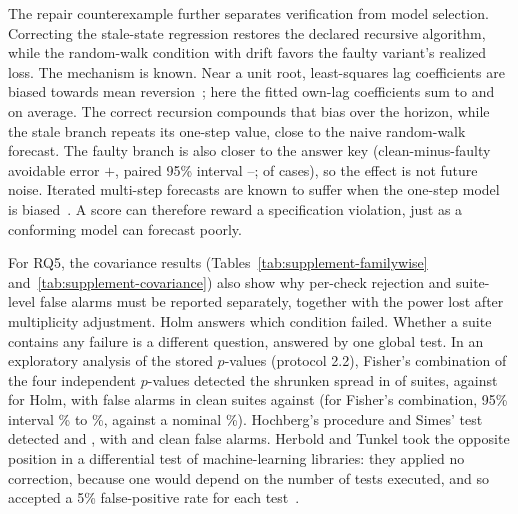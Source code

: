 \documentclass[11pt,a4paper]{article}
\begin{document}
The repair counterexample further separates verification from model
selection. Correcting the stale-state regression restores the declared
recursive algorithm, while the random-walk condition with drift favors the faulty
variant's realized loss. The mechanism is known. Near a unit root,
least-squares lag coefficients are biased towards mean
reversion~\cite{kendall1954note,dickey1979distribution}; here the fitted
own-lag coefficients sum to \OwnLagSumFirst{} and \OwnLagSumSecond{} on
average. The correct recursion compounds that bias over the horizon,
while the stale branch repeats its one-step value, close to the naive
random-walk forecast. The faulty branch is also closer to the answer key
(clean-minus-faulty avoidable error $+$\ReferenceDeltaMean{}, paired 95\%
interval \ReferenceDeltaLow{}--\ReferenceDeltaHigh{}; \FaultyCloserCases{}
of \CasesPerCondition{} cases), so the effect is not future noise.
Iterated multi-step forecasts are known to suffer when the one-step model
is biased~\cite{marcellino2006comparison,chevillon2007direct}. A score can therefore reward a specification
violation, just as a conforming model can forecast poorly.

For RQ5, the covariance results (Tables~\ref{tab:supplement-familywise}
and~\ref{tab:supplement-covariance}) also show why per-check rejection and
suite-level false alarms must be reported separately, together with the
power lost after multiplicity adjustment. Holm answers which condition
failed. Whether a suite contains any failure is a different question,
answered by one global test. In an exploratory analysis of the stored
$p$-values (protocol 2.2), Fisher's combination of the four independent
$p$-values detected the shrunken spread in \FisherSpreadSuites{} of
\SuitesPerVariant{} suites, against \HolmSpreadSuites{} for Holm, with
\FisherCleanSuites{} false alarms in \SuitesPerVariant{} clean suites
against \HolmCleanSuites{} (for Fisher's combination, 95\% interval
\FisherCleanLow{}\% to \FisherCleanHigh{}\%, against a nominal
\SuiteAlphaPercent{}\%).
Hochberg's procedure and Simes' test detected \HochbergSpreadSuites{} and
\SimesSpreadSuites{}, with \HochbergCleanSuites{} and \SimesCleanSuites{}
clean false alarms. Herbold and Tunkel took the opposite position in a
differential test of machine-learning libraries: they applied no
correction, because one would depend on the number of tests executed, and
so accepted a 5\% false-positive rate for each
test~\cite{herbold2023differential}.
\end{document}
